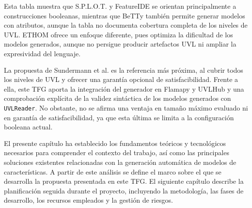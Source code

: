 Esta tabla muestra que S.P.L.O.T. y FeatureIDE se orientan principalmente
a construcciones booleanas, mientras que BeTTy también permite generar
modelos con atributos, aunque la tabla no documenta cobertura completa
de los niveles de UVL. ETHOM ofrece un enfoque diferente, pues
optimiza la dificultad de los modelos generados, aunque no persigue producir
artefactos UVL ni ampliar la expresividad del lenguaje.

La propuesta de Sundermann et al. es la referencia más próxima, al cubrir todos
los niveles de UVL y ofrecer una garantía opcional de satisfacibilidad. Frente a
ella, este TFG aporta la integración del generador en Flamapy y UVLHub y una
comprobación explícita de la validez sintáctica de los modelos generados con
\texttt{UVLReader}. No obstante, no se afirma una ventaja en tamaño máximo
evaluado ni en garantía de satisfacibilidad, ya que esta última se limita a la
configuración booleana actual.


El presente capítulo ha establecido los fundamentos teóricos y tecnológicos
necesarios para comprender el contexto del trabajo, así como las principales
soluciones existentes relacionadas con la generación automática de modelos de
características. A partir de este análisis se define el marco sobre el que se
desarrolla la propuesta presentada en este TFG. El siguiente capítulo describe
la planificación seguida durante el proyecto, incluyendo la metodología,
las fases de desarrollo, los recursos empleados y la gestión de riesgos.